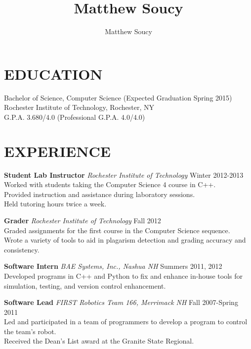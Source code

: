 \documentclass[line]{res}
\author{Matthew Soucy}
\title{Matthew Soucy}
\begin{document}
\setlength{\textheight}{11.5in} %
\address{\large 2433 Nathaniel Rochester Hall\\
		Rochester, NY 14623\\
		(603) 204-1994}
\begin{resume}

\section{EDUCATION}
    Bachelor of Science, Computer Science (Expected Graduation Spring 2015)\\
    Rochester Institute of Technology, Rochester, NY\\
    G.P.A. 3.680/4.0 (Professional G.P.A. 4.0/4.0)

\section{EXPERIENCE}
   \textbf{Student Lab Instructor}
   \textit{Rochester Institute of Technology}
   \hfill
   Winter 2012-2013\\
   Worked with students taking the Computer Science 4 course in C++.\\
   Provided instruction and assistance during laboratory sessions.\\
   Held tutoring hours twice a week.

   \textbf{Grader}
   \textit{Rochester Institute of Technology}
   \hfill
   Fall 2012\\
   Graded assignments for the first course in the Computer Science sequence.\\
   Wrote a variety of tools to aid in plagarism detection and grading accuracy and consistency.

   \textbf{Software Intern}
   \textit{BAE Systems, Inc., Nashua NH}
   \hfill
   Summers 2011, 2012\\
	Developed programs in C++ and Python to fix and enhance in-house tools for simulation, testing, and version control enhancement.

	\textbf{Software Lead}
	\textit{FIRST Robotics Team 166, Merrimack NH}
	\hfill
	Fall 2007-Spring 2011\\
	Led and participated in a team of programmers to develop a program to control the team's robot.\\
	Received the Dean's List award at the Granite State Regional.


\end{resume}
\end{document}
